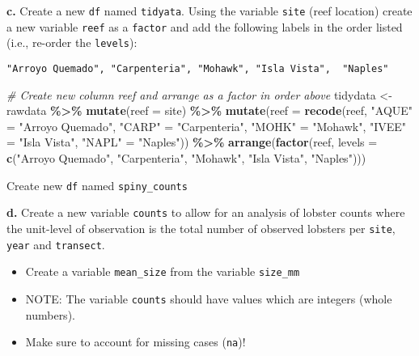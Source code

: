 \documentclass[
]{article}
\newenvironment{Shaded}{\begin{snugshade}}{\end{snugshade}}
\newcommand{\AttributeTok}[1]{\textcolor[rgb]{0.13,0.29,0.53}{#1}}
\newcommand{\CommentTok}[1]{\textcolor[rgb]{0.56,0.35,0.01}{\textit{#1}}}
\newcommand{\FunctionTok}[1]{\textcolor[rgb]{0.13,0.29,0.53}{\textbf{#1}}}
\newcommand{\NormalTok}[1]{#1}
\newcommand{\OtherTok}[1]{\textcolor[rgb]{0.56,0.35,0.01}{#1}}
\newcommand{\SpecialCharTok}[1]{\textcolor[rgb]{0.81,0.36,0.00}{\textbf{#1}}}
\newcommand{\StringTok}[1]{\textcolor[rgb]{0.31,0.60,0.02}{#1}}
\providecommand{\tightlist}{%
  \setlength{\itemsep}{0pt}\setlength{\parskip}{0pt}}
\begin{document}
\textbf{c.} Create a new \texttt{df} named \texttt{tidyata}. Using the
variable \texttt{site} (reef location) create a new variable
\texttt{reef} as a \texttt{factor} and add the following labels in the
order listed (i.e., re-order the \texttt{levels}):

\begin{verbatim}
"Arroyo Quemado", "Carpenteria", "Mohawk", "Isla Vista",  "Naples"
\end{verbatim}

\begin{Shaded}
\begin{Highlighting}[]
\CommentTok{\# Create new column \textquotesingle{}reef\textquotesingle{} and arrange as a factor in order above}
\NormalTok{tidydata }\OtherTok{\textless{}{-}}\NormalTok{ rawdata }\SpecialCharTok{\%\textgreater{}\%} 
    \FunctionTok{mutate}\NormalTok{(}\AttributeTok{reef =}\NormalTok{ site) }\SpecialCharTok{\%\textgreater{}\%} 
    \FunctionTok{mutate}\NormalTok{(}\AttributeTok{reef =} \FunctionTok{recode}\NormalTok{(reef, }
                         \StringTok{"AQUE"} \OtherTok{=} \StringTok{"Arroyo Quemado"}\NormalTok{,}
                         \StringTok{"CARP"} \OtherTok{=} \StringTok{"Carpenteria"}\NormalTok{,}
                         \StringTok{"MOHK"} \OtherTok{=} \StringTok{"Mohawk"}\NormalTok{,}
                         \StringTok{"IVEE"} \OtherTok{=} \StringTok{"Isla Vista"}\NormalTok{,}
                         \StringTok{"NAPL"} \OtherTok{=} \StringTok{"Naples"}\NormalTok{)) }\SpecialCharTok{\%\textgreater{}\%} 
    \FunctionTok{arrange}\NormalTok{(}\FunctionTok{factor}\NormalTok{(reef, }
                   \AttributeTok{levels =} \FunctionTok{c}\NormalTok{(}\StringTok{"Arroyo Quemado"}\NormalTok{, }
                             \StringTok{"Carpenteria"}\NormalTok{, }
                             \StringTok{"Mohawk"}\NormalTok{,}
                             \StringTok{"Isla Vista"}\NormalTok{,}
                             \StringTok{"Naples"}\NormalTok{)))}
\end{Highlighting}
\end{Shaded}

Create new \texttt{df} named \texttt{spiny\_counts}

\textbf{d.} Create a new variable \texttt{counts} to allow for an
analysis of lobster counts where the unit-level of observation is the
total number of observed lobsters per \texttt{site}, \texttt{year} and
\texttt{transect}.

\begin{itemize}
\tightlist
\item
  Create a variable \texttt{mean\_size} from the variable
  \texttt{size\_mm}
\item
  NOTE: The variable \texttt{counts} should have values which are
  integers (whole numbers).
\item
  Make sure to account for missing cases (\texttt{na})!
\end{itemize}
\end{document}
